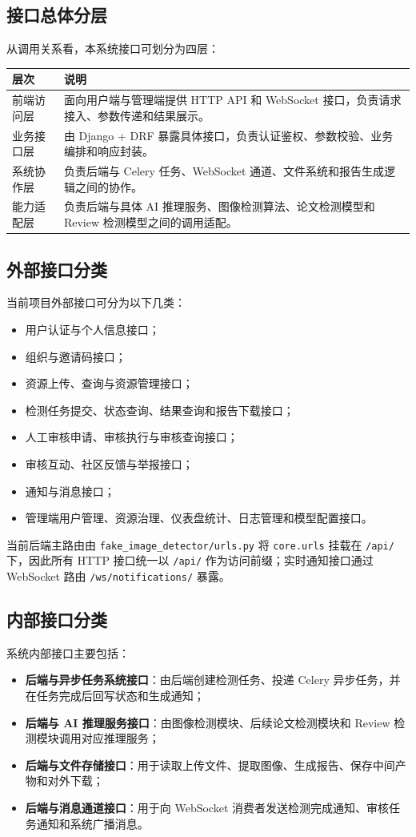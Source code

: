 \subsection{接口总体分层}
从调用关系看，本系统接口可划分为四层：
\begin{longtable}{|p{3cm}|p{10.8cm}|}
\hline
层次 & 说明 \\ \hline
前端访问层 & 面向用户端与管理端提供 HTTP API 和 WebSocket 接口，负责请求接入、参数传递和结果展示。 \\ \hline
业务接口层 & 由 Django + DRF 暴露具体接口，负责认证鉴权、参数校验、业务编排和响应封装。 \\ \hline
系统协作层 & 负责后端与 Celery 任务、WebSocket 通道、文件系统和报告生成逻辑之间的协作。 \\ \hline
能力适配层 & 负责后端与具体 AI 推理服务、图像检测算法、论文检测模型和 Review 检测模型之间的调用适配。 \\ \hline
\end{longtable}

\subsection{外部接口分类}
当前项目外部接口可分为以下几类：
\begin{itemize}[leftmargin=2em]
    \item 用户认证与个人信息接口；
    \item 组织与邀请码接口；
    \item 资源上传、查询与资源管理接口；
    \item 检测任务提交、状态查询、结果查询和报告下载接口；
    \item 人工审核申请、审核执行与审核查询接口；
    \item 审核互动、社区反馈与举报接口；
    \item 通知与消息接口；
    \item 管理端用户管理、资源治理、仪表盘统计、日志管理和模型配置接口。
\end{itemize}

当前后端主路由由 \texttt{fake\_image\_detector/urls.py} 将 \texttt{core.urls} 挂载在 \texttt{/api/} 下，因此所有 HTTP 接口统一以 \texttt{/api/} 作为访问前缀；实时通知接口通过 WebSocket 路由 \texttt{/ws/notifications/} 暴露。

\subsection{内部接口分类}
系统内部接口主要包括：
\begin{itemize}[leftmargin=2em]
    \item \textbf{后端与异步任务系统接口}：由后端创建检测任务、投递 Celery 异步任务，并在任务完成后回写状态和生成通知；
    \item \textbf{后端与 AI 推理服务接口}：由图像检测模块、后续论文检测模块和 Review 检测模块调用对应推理服务；
    \item \textbf{后端与文件存储接口}：用于读取上传文件、提取图像、生成报告、保存中间产物和对外下载；
    \item \textbf{后端与消息通道接口}：用于向 WebSocket 消费者发送检测完成通知、审核任务通知和系统广播消息。
\end{itemize}

